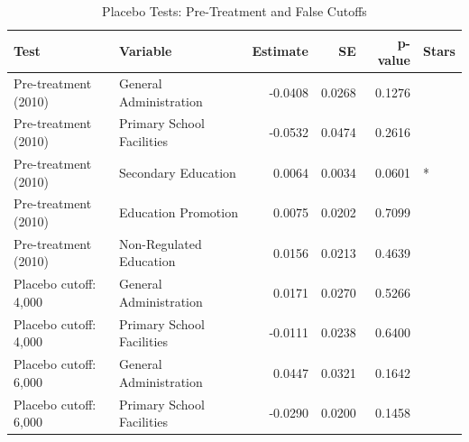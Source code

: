 \begin{table}[!h]
\centering
\caption{\label{tab:placebo}Placebo Tests: Pre-Treatment and False Cutoffs}
\centering
\begin{tabular}[t]{llrrrl}
\toprule
Test & Variable & Estimate & SE & p-value & Stars\\
\midrule
Pre-treatment (2010) & General Administration & -0.0408 & 0.0268 & 0.1276 & \\
Pre-treatment (2010) & Primary School Facilities & -0.0532 & 0.0474 & 0.2616 & \\
Pre-treatment (2010) & Secondary Education & 0.0064 & 0.0034 & 0.0601 & *\\
Pre-treatment (2010) & Education Promotion & 0.0075 & 0.0202 & 0.7099 & \\
Pre-treatment (2010) & Non-Regulated Education & 0.0156 & 0.0213 & 0.4639 & \\
\addlinespace
Placebo cutoff: 4,000 & General Administration & 0.0171 & 0.0270 & 0.5266 & \\
Placebo cutoff: 4,000 & Primary School Facilities & -0.0111 & 0.0238 & 0.6400 & \\
Placebo cutoff: 6,000 & General Administration & 0.0447 & 0.0321 & 0.1642 & \\
Placebo cutoff: 6,000 & Primary School Facilities & -0.0290 & 0.0200 & 0.1458 & \\
\bottomrule
\end{tabular}
\end{table}
